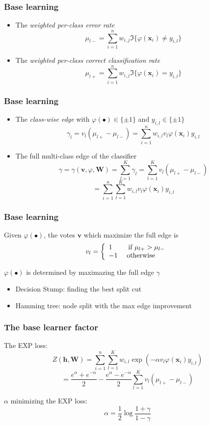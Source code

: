 \documentclass{beamer}
\begin{document}
\begin{frame}
\frametitle{Base learning}
\begin{itemize}
\item The \textit{weighted per-class error rate}
$$\mu_{l-} = \sum_{i=1}^{n}w_{i,j}\mathfrak{I}\{\varphi(\mathbf{x}_i) \neq y_{i,l}\}$$
\item The \textit{weighted per-class correct classification rate}
$$\mu_{l+} = \sum_{i=1}^{n}w_{i,j}\mathfrak{I}\{\varphi(\mathbf{x}_i) = y_{i,l}\}$$
\end{itemize}
\end{frame}

\begin{frame}
\frametitle{Base learning}
\begin{itemize}
\item The \textit{class-wise edge} with $\varphi(\bullet) \in \{\pm 1\}$ and $y_{i,l} \in \{\pm 1\}$
$$\gamma_l = v_l (\mu_{l+} - \mu_{l-}) = \sum_{i=1}^{n} w_{i,l} v_l \varphi(\mathbf{x}_i) y_{i,l}$$
\item The full multi-class edge of the classifier
$$\gamma = \gamma(\mathbf{v}, \varphi, \mathbf{W}) = \sum_{l=1}^{K} \gamma_l = \sum_{l=1}^{K} v_l(\mu_{l+} - \mu_{l-})$$
$$= \sum_{i=1}^{n} \sum_{l=1}^{K} w_{i,l} v_l \varphi(\mathbf{x}_i) y_{i,l} $$
\end{itemize}
\end{frame}

\begin{frame}
\frametitle{Base learning}
\begin{block}{Given $\varphi(\bullet)$, the votes $\mathbf{v}$}
which maximize the full edge is
\[v_l = \left\{
  \begin{array}{l l}
  1 \quad \quad \text{   if } \mu_{l+} > \mu_{l-} \\
  -1 \quad \text{ otherwise }
  \end{array} \right. \]
\end{block}
\begin{block}{$\varphi(\bullet)$ is determined by maximazing the full edge $\gamma$}
\begin{itemize}
\item Decision Stump: finding the best split cut
\item Hamming tree: node split with the max edge improvement
\end{itemize}
\end{block}
\end{frame}

\begin{frame}
\frametitle{The base learner factor}
\begin{block}{The EXP loss:}
$$Z(\mathbf{h}, \mathbf{W}) = \sum_{i=1}^{n} \sum_{l=1}^{K} w_{i,l} \exp(-\alpha v_l \varphi(\mathbf{x}_i) y_{i,l}) $$
$$= \frac{e^\alpha + e^{-\alpha}}{2} - \frac{e^\alpha - e^{-\alpha}}{2} \sum_{l=1}^{K} v_l(\mu_{l+} - \mu_{l-})$$
\end{block}
\begin{block}{$\alpha$ minimizing the EXP loss:}
$$\alpha = \frac{1}{2} \log \frac{1+\gamma}{1-\gamma}$$
\end{block}
\end{frame}
\end{document}
